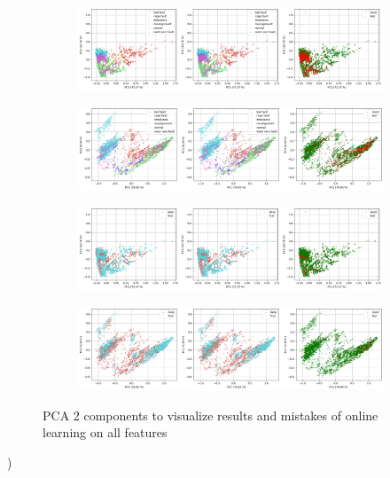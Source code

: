 \begin{figure}[ht]
    \centering
    \begin{subfigure}[b]{\textwidth}
        \includegraphics[width=\textwidth]{assets/design/pca-scatter-online-fault-temporal.png}
        \caption{}
    \end{subfigure}
    \hfill
    \begin{subfigure}[b]{\textwidth}
        \includegraphics[width=\textwidth]{assets/design/pca-scatter-online-fault-spectral.png}
        \caption{}
    \end{subfigure}
    \begin{subfigure}[b]{\textwidth}
        \includegraphics[width=\textwidth]{assets/design/pca-scatter-online-anomaly60-temporal.png}
        \caption{}
    \end{subfigure}
    \hfill
    \begin{subfigure}[b]{\textwidth}
        \includegraphics[width=\textwidth]{assets/design/pca-scatter-online-anomaly60-spectral.png}
        \caption{}
    \end{subfigure}
    \caption{PCA 2 components to visualize results and mistakes of online learning on all features}
\end{figure}
)



